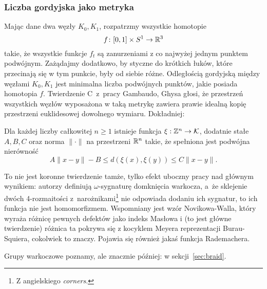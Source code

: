 
\subsubsection{Liczba gordyjska jako metryka}
Mając dane dwa węzły $K_0, K_1$, rozpatrzmy wszystkie homotopie
\begin{equation}
    f \colon [0,1] \times S^1 \to \mathbb R^3
\end{equation}
takie, że wszystkie funkcje $f_t$ są zanurzeniami z co najwyżej jednym punktem podwójnym.
Zażądajmy dodatkowo, by styczne do krótkich łuków, które przecinają się w tym punkcie, były od siebie różne.
Odległością gordyjską między węzłami $K_0, K_1$ jest minimalna liczba podwójnych punktów, jakie posiada homotopia $f$.
Twierdzenie C~z~pracy Gambaudo, Ghysa \cite{gambaudo05} głosi, że przestrzeń wszystkich węzłów wyposażona w taką metrykę zawiera prawie idealną kopię przestrzeni euklidesowej dowolnego wymiaru.
%
%
Dokładniej:

\begin{proposition}
    Dla każdej liczby całkowitej $n \ge 1$ istnieje funkcja $\xi: \mathbb Z^n \to \mathcal{K}$, dodatnie stałe $A, B, C$ oraz norma $\|\cdot\|$ na przestrzeni $\mathbb R^n$ takie, że spełniona jest podwójna nierówność
    \begin{equation}
        A\|x-y\| - B \le d(\xi(x), \xi(y)) \le C\|x-y\|.
    \end{equation}
\end{proposition}

To nie jest koronne twierdzenie tamże, tylko efekt uboczny pracy nad głównym wynikiem: autorzy definiują $\omega$-sygnaturę domknięcia warkocza, a~że sklejenie dwóch 4-rozmaitości z~narożnikami\footnote{Z angielskiego \emph{corners}.} nie odpowiada dodaniu ich sygnatur, to ich funkcja nie jest homomorfizmem.
%
Wspomniany jest wzór Novikowa-Walla, który wyraża różnicę pewnych defektów jako indeks Masłowa i (to jest główne twierdzenie) różnica ta pokrywa się z kocyklem Meyera reprezentacji Burau-Squiera, cokolwiek to znaczy.
Pojawia się również jakaś funkcja Rademachera.
%
%
%
%
%

Grupy warkoczowe poznamy, ale znacznie później: w sekcji~\ref{sec:braid}.


